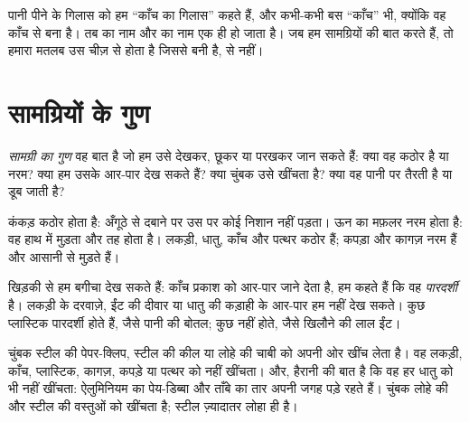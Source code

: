 \begin{remark}[ऐसे नाम जो सामग्रियों के भी हैं]\label{rem:g1:materials-around-us:names}
पानी पीने के गिलास को हम ``काँच का गिलास'' कहते हैं, और कभी-कभी बस
``काँच'' भी, क्योंकि वह काँच से बना है। तब  का नाम और 
का नाम एक ही हो जाता है। जब हम सामग्रियों की बात करते हैं, तो हमारा
मतलब उस चीज़ से होता है जिससे  बनी है,  से नहीं।
\end{remark}

\section{सामग्रियों के गुण}

\begin{definition}[सामग्री का गुण]\label{def:g1:materials-around-us:property}
\emph{सामग्री का गुण} वह बात है जो हम उसे देखकर,
छूकर या परखकर जान सकते हैं: क्या वह कठोर है या नरम? क्या हम उसके
आर-पार देख सकते हैं? क्या चुंबक उसे खींचता है? क्या वह पानी पर
तैरती है या डूब जाती है?
\end{definition}

\begin{example}[कठोर और नरम]\label{ex:g1:materials-around-us:hard}
कंकड़ कठोर होता है: अँगूठे से दबाने पर उस पर कोई निशान नहीं पड़ता।
ऊन का मफ़लर नरम होता है: वह हाथ में मुड़ता और तह होता है। लकड़ी, धातु,
काँच और पत्थर कठोर हैं; कपड़ा और कागज़ नरम हैं और आसानी से मुड़ते हैं।
\end{example}

\begin{example}[आर-पार देखना]\label{ex:g1:materials-around-us:see-through}
खिड़की से हम बगीचा देख सकते हैं: काँच प्रकाश को आर-पार जाने देता है,
हम कहते हैं कि वह \emph{पारदर्शी} है। लकड़ी के दरवाज़े, ईंट की दीवार
या धातु की कड़ाही के आर-पार हम नहीं देख सकते। कुछ प्लास्टिक पारदर्शी
होते हैं, जैसे पानी की बोतल; कुछ नहीं होते, जैसे खिलौने की लाल ईंट।
\end{example}

\begin{example}[चुंबक से खिंचना]\label{ex:g1:materials-around-us:magnet}
चुंबक स्टील की पेपर-क्लिप, स्टील की कील या लोहे की चाबी को अपनी ओर
खींच लेता है। वह लकड़ी, काँच, प्लास्टिक, कागज़, कपड़े या पत्थर को
नहीं खींचता। और, हैरानी की बात है कि वह हर धातु को भी नहीं खींचता:
ऐलुमिनियम का पेय-डिब्बा और ताँबे का तार अपनी जगह पड़े रहते हैं। चुंबक
लोहे की और स्टील की वस्तुओं को खींचता है; स्टील ज़्यादातर लोहा ही है।
\end{example}

